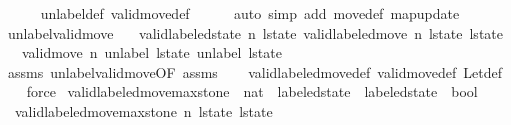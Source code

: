 \begin{isabellebody}
\ \ \ \ \isamarkupfalse%
\ unlabel{\isacharunderscore}def\ valid{\isacharunderscore}move{\isacharprime}{\isacharunderscore}def\isanewline
\ \ \ \ \isamarkupfalse%
\ {\isacharparenleft}auto\ simp\ add{\isacharcolon}\ move{\isacharunderscore}def\ map{\isacharunderscore}update{\isacharparenright}\isanewline
{}\isamarkupfalse%
%
\endisatagproof
{\isafoldproof}%
%
\isadelimproof
\isanewline
%
\endisadelimproof
\isanewline
{}\isamarkupfalse%
\ unlabel{\isacharunderscore}valid{\isacharunderscore}move{\isacharcolon}\isanewline
\ \ \ {\isachardoublequoteopen}valid{\isacharunderscore}labeled{\isacharunderscore}state\ n\ l{\isacharunderscore}state{\isachardoublequoteclose}\ {\isachardoublequoteopen}valid{\isacharunderscore}labeled{\isacharunderscore}move\ n\ l{\isacharunderscore}state\ l{\isacharunderscore}state{\isacharprime}{\isachardoublequoteclose}\isanewline
\ \ \ {\isachardoublequoteopen}valid{\isacharunderscore}move\ n\ {\isacharparenleft}unlabel\ l{\isacharunderscore}state{\isacharparenright}\ {\isacharparenleft}unlabel\ l{\isacharunderscore}state{\isacharprime}{\isacharparenright}{\isachardoublequoteclose}\isanewline
%
\isadelimproof
\ \ %
\endisadelimproof
%
\isatagproof
{}\isamarkupfalse%
\ assms{\isacharparenleft}{}{\isacharparenright}\ unlabel{\isacharunderscore}valid{\isacharunderscore}move{\isacharprime}{\isacharbrackleft}OF\ assms{\isacharparenleft}{}{\isacharparenright}{\isacharbrackright}\isanewline
\ \ \isamarkupfalse%
\ valid{\isacharunderscore}labeled{\isacharunderscore}move{\isacharunderscore}def\ valid{\isacharunderscore}move{\isacharunderscore}def\ Let{\isacharunderscore}def\isanewline
\ \ \isamarkupfalse%
\ force%
\endisatagproof
{\isafoldproof}%
%
\isadelimproof
%
\endisadelimproof
%
\isadelimdocument
%
\endisadelimdocument
%
\isatagdocument
%
\isamarkuptrue%
%
\endisatagdocument
{\isafolddocument}%
%
\isadelimdocument
%
\endisadelimdocument
{}\isamarkupfalse%
\ valid{\isacharunderscore}labeled{\isacharunderscore}move{\isacharunderscore}max{\isacharunderscore}stone\ {\isacharcolon}{\isacharcolon}\ {\isachardoublequoteopen}nat\ {\isasymRightarrow}\ labeled{\isacharunderscore}state\ {\isasymRightarrow}\ labeled{\isacharunderscore}state\ {\isasymRightarrow}\ bool{\isachardoublequoteclose}\ \ \isanewline
\ \ {\isachardoublequoteopen}valid{\isacharunderscore}labeled{\isacharunderscore}move{\isacharunderscore}max{\isacharunderscore}stone\ n\ l{\isacharunderscore}state\ l{\isacharunderscore}state{\isacharprime}\ {\isasymlongleftrightarrow}\ \isanewline

\end{isabellebody}
